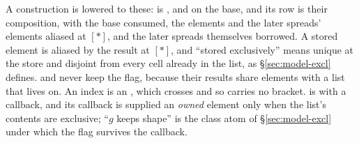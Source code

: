 A construction is lowered to these: \code{[ x, …acc, y, …ys ]} is ,  and
 on the base, and its row is their composition, with the base consumed, the elements and the
later spreads' elements aliased at $[\ast]$, and the later spreads themselves borrowed. A stored element
is aliased by the result at $[\ast]$, and ``stored exclusively'' means unique at the store and disjoint
from every cell already in the list, as \S\ref{sec:model-excl} defines.  and 
never keep the flag, because their results share elements with a list that lives on. An index is an
, which crosses and so carries no bracket.  is  with a callback, and its
callback is supplied an \emph{owned} element only when the list's contents are exclusive; ``$g$ keeps
shape'' is the class atom of \S\ref{sec:model-excl} under which the flag survives the callback.

